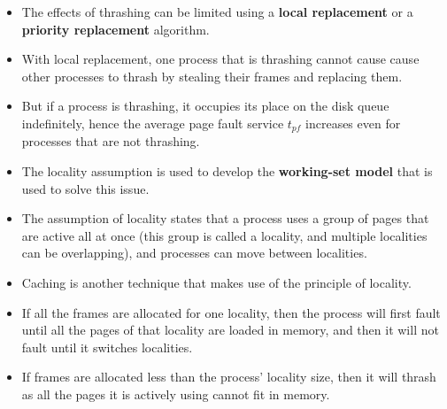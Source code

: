 \documentclass{article}
\theoremstyle{plain}
\theoremstyle{definition}
\begin{document}
\begin{itemize}
    \item The effects of thrashing can be limited using a \textbf{local replacement} or a \textbf{priority replacement} algorithm. 
    
    \item With local replacement, one process that is thrashing cannot cause cause other processes to thrash by stealing their frames and replacing them. 
    
    \item But if a process is thrashing, it occupies its place on the disk queue indefinitely, hence the average page fault service $t_{pf}$ increases even for processes that are not thrashing.
    
    \item The locality assumption is used to develop the \textbf{working-set model} that is used to solve this issue.
    
    \item The assumption of locality states that a process uses a group of pages that are active all at once (this group is called a locality, and multiple localities can be overlapping), and processes can move between localities. 
    
    \item Caching is another technique that makes use of the principle of locality. 
    
    \item If all the frames are allocated for one locality, then the process will first fault until all the pages of that locality are loaded in memory, and then it will not fault until it switches localities. 
    
    \item If frames are allocated less than the process' locality size, then it will thrash as all the pages it is actively using cannot fit in memory.
\end{itemize}
\end{document}
